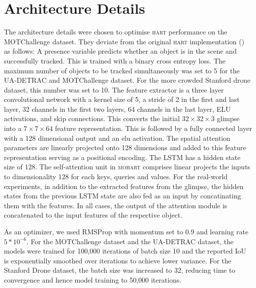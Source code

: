 \section{Architecture Details}
\label{sec:mohart_architecture_details}
The architecture details were chosen to optimise \textsc{hart} performance on the MOTChallenge dataset. They deviate from the original \textsc{hart} implementation () as follows: A presence variable predicts whether an object is in the scene and successfully tracked. This is trained with a binary cross entropy loss. The maximum number of objects to be tracked simultaneously was set to 5 for the UA-DETRAC and MOTChallenge dataset. For the more crowded Stanford drone dataset, this number was set to 10. The feature extractor is a three layer convolutional network with a kernel size of 5, a stride of 2 in the first and last layer, 32 channels in the first two layers, 64 channels in the last layer, ELU activations, and skip connections. This converts the initial $32 \times 32 \times 3$ glimpse into a $7 \times 7 \times 64$ feature representation. This is followed by a fully connected layer with a 128 dimensional output and an elu activation. The spatial attention parameters are linearly projected onto 128 dimensions and added to this feature representation serving as a positional encoding. The LSTM has a hidden state size of 128. The self-attention unit in \textsc{mohart} comprises linear projects the inputs to dimensionality 128 for each keys, queries and values. For the real-world experiments, in addition to the extracted features from the glimpse, the hidden states from the previous LSTM state are also fed as an input by concatinating them with the features. In all cases, the output of the attention module is concatenated to the input features of the respective object.

As an optimizer, we used RMSProp with momentum set to $0.9$ and learning rate $5*10^{-6}$. For the MOTChallenge dataset and the UA-DETRAC dataset, the models were trained for 100,000 iterations of batch size 10 and the reported IoU is exponentially smoothed over iterations to achieve lower variance. For the Stanford Drone dataset, the batch size was increased to 32, reducing time to convergence and hence model training to 50,000 iterations.
